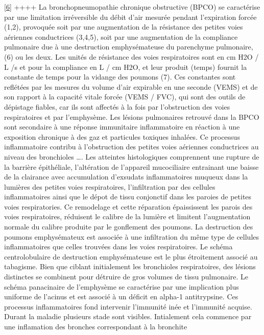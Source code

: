 \documentclass[12pt,]{article}
\begin{document}
{[}\protect\hyperlink{ref-hogg2004pathophysiology}{6}{]} ++++ La
bronchopneumopathie chronique obstructive (BPCO) se caractérise par une
limitation irréversible du débit d'air mesurée pendant l'expiration
forcée (1,2), provoquée soit par une augmentation de la résistance des
petites voies aériennes conductrices (3,4,5), soit par une augmentation
de la compliance pulmonaire due à une destruction emphysémateuse du
parenchyme pulmonaire, (6) ou les deux. Les unités de résistance des
voies respiratoires sont en cm H2O / L /s et pour la compliance en L /
cm H2O, et leur produit (temps) fournit la constante de temps pour la
vidange des poumons (7). Ces constantes sont reflétées par les mesures
du volume d'air expirable en une seconde (VEMS) et de son rapport à la
capacité vitale forcée (VEMS / FVC), qui sont des outils de dépistage
fiables, car ils sont affectés à la fois par l'obstruction des voies
respiratoires et par l'emphysème. Les lésions pulmonaires retrouvé dans
la BPCO sont secondaire à une réponse immunitaire inflammatoire en
réaction à une exposition chronique à des gaz et particules toxiques
inhalées. Ce processus inflammatoire contribu à l'obstruction des
petites voies aériennes conductrices au niveau des bronchioles \ldots{}.
Les atteintes histologiques comprennent une rupture de la barrière
épithéliale, l'altération de l'appareil mucociliaire entrainant une
baisse de la clairance avec accumulation d'exsudats inflammatoires
muqueux dans la lumières des petites voies respiratoires, l'infiltration
par des cellules inflammatoires ainsi que le dépot de tissu conjonctif
dans les paroies de petites voies respiratories. Ce remodelage et cette
réparation épaississent les parois des voies respiratoires, réduisent le
calibre de la lumière et limitent l'augmentation normale du calibre
produite par le gonflement des poumons. La destruction des poumons
emphysémateux est associée à une infiltration du même type de cellules
inflammatoires que celles trouvées dans les voies respiratoires. Le
schéma centrolobulaire de destruction emphysémateuse est le plus
étroitement associé au tabagisme. Bien que ciblant initialement les
bronchioles respiratoires, des lésions distinctes se combinent pour
détruire de gros volumes de tissu pulmonaire. Le schéma panacinaire de
l'emphysème se caractérise par une implication plus uniforme de l'acinus
et est associé à un déficit en alpha-1 antitrypsine. Ces processus
inflammatoires fond intervenir l'immunité inée et l'immunité acquise.
Durant la maladie plusieurs stade sont visibles. Intialement cela
commence par une inflamation des bronches correspondant à la bronchite
\end{document}
